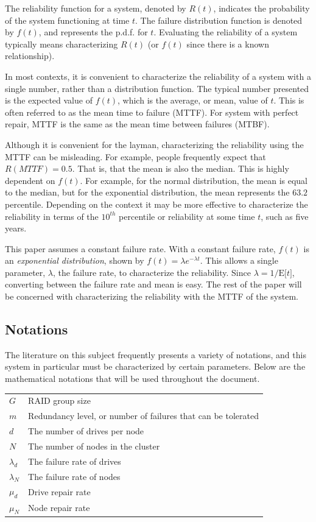 \documentclass[11pt]{article}
\numberwithin{equation}{section}
\begin{document}
The reliability function for a system, denoted by $R(t)$, indicates the
probability of the system functioning at time $t$.  The failure distribution
function is denoted by $f(t)$, and represents the p.d.f. for $t$.  Evaluating
the reliability of a system typically means characterizing $R(t)$ (or $f(t)$
since there is a known relationship).

In most contexts, it is convenient to characterize the reliability of a system
with a single number, rather than a distribution function.  The typical number
presented is the expected value of $f(t)$, which is the average, or mean,
value of $t$.  This is often referred to as the mean time to failure (MTTF).
For system with perfect repair, MTTF is the same as the mean time between
failures (MTBF).  

Although it is convenient for the layman, characterizing the reliability using
the MTTF can be misleading.  For example, people frequently expect that
$R(MTTF) = 0.5$.  That is, that the mean is also the median.  This is highly
dependent on $f(t)$.  For example, for the normal distribution, the mean is
equal to the median, but for the exponential distribution, the mean represents
the $63.2$ percentile.  Depending on the context it may be more effective to
characterize the reliability in terms of the $10^{th}$ percentile or
reliability at some time $t$, such as five years.

This paper assumes a constant failure rate.  With a constant failure rate,
$f(t)$ is an {\em exponential distribution}, shown by $f(t) = \lambda
e^{-\lambda t}$.  This allows a single parameter, $\lambda$, the failure rate,
to characterize the reliability.  Since $\lambda = 1/\textrm{E[$t$]}$,
converting between the failure rate and mean is easy.  The rest of the paper
will be concerned with characterizing the reliability with the MTTF of the
system.

\subsection{Notations}

The literature on this subject frequently presents a variety of notations, and
this system in particular must be characterized by certain parameters.  Below
are the mathematical notations that will be used throughout the document.  
\\

\begin{tabular}{ll}
$G$ & RAID group size 
\\
$m$ & Redundancy level, or number of failures that can be tolerated 
\\
$d$ & The number of drives per node 
\\
$N$ & The number of nodes in the cluster 
\\
$\lambda_{d}$ & The failure rate of drives 
\\
$\lambda_{N}$ & The failure rate of nodes 
\\
$\mu_{d}$ & Drive repair rate
\\
$\mu_{N}$ & Node repair rate
\end{tabular}
\end{document}
